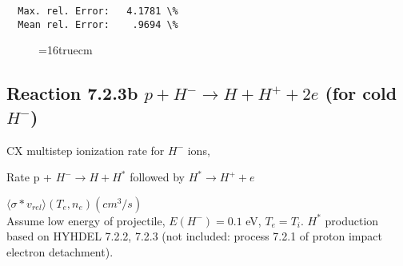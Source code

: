 \documentclass[12pt,dvipdfmx]{article}
\begin{document}
\begin{small}
\begin{verbatim}
  Max. rel. Error:   4.1781 \%
  Mean rel. Error:    .9694 \%
\end{verbatim}\end{small}
\begin{figure} \label{7.2.3a}
\epsfxsize=16truecm
\end{figure}
\newpage

\subsection{
Reaction 7.2.3b   $ p + H^{-} \rightarrow  H + H^+ + 2e$ (for cold $H^-$)
}

  CX multistep ionization rate for $H^-$ ions,
 \cite{kn:Sawada}

  Rate p + $H^- \rightarrow H + H^*$ followed by $H^* \rightarrow H^+
+e$

$  \langle \sigma*v_{rel} \rangle(T_e,n_e) (cm^3/s)$ \\
Assume low energy of projectile, $E(H^-)=0.1$ eV, $T_e = T_i$.
$H^*$ production based on HYHDEL 7.2.2, 7.2.3 (not included: process 7.2.1 of proton impact electron detachment).
\end{document}
